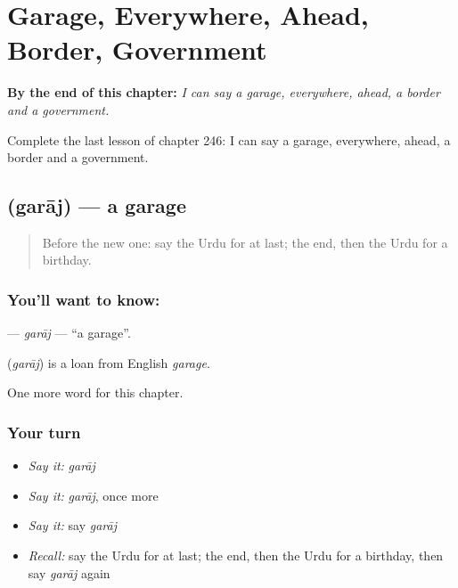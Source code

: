 
\chapter{Garage, Everywhere, Ahead, Border, Government}
\label{ch:ur-garage-everywhere-ahead-border-government}

\begin{chapteropening}
\textbf{By the end of this chapter:} \emph{I can say a garage, everywhere, ahead, a border and a government.}

Complete the last lesson of chapter 246: I can say a garage, everywhere, ahead, a border and a government.
\end{chapteropening}

\section[\texorpdfstring{\ur{گیراج} (garāj)}{گیراج (garāj)}]{ (garāj) — a garage}

\label{lesson:UR-C246-garaj}



\begin{quote}
Before the new one: say the Urdu for at last; the end, then the Urdu for a birthday.
\end{quote}

\subsection*{You'll want to know: }
\textbf{} — \emph{garāj} — \textquotedblleft{}a garage\textquotedblright{}.

\begin{cousinweb}
\textbf{} (\emph{garāj}) is a loan from English \emph{garage}.
\end{cousinweb}

\begin{grammarlens}[title={What you've built}]
One more word for this chapter.
\end{grammarlens}

\subsection*{Your turn}
\begin{itemize}
\raggedright
  \item \emph{Say it:} \emph{garāj}
  \item \emph{Say it:} \emph{garāj}, once more
  \item \emph{Say it:} say \emph{garāj}
  \item \emph{Recall:} say the Urdu for at last; the end, then the Urdu for a birthday, then say \emph{garāj} again
\end{itemize}

